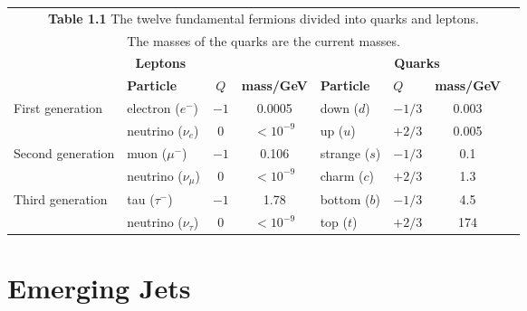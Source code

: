 
\begin{table}[h] %
	\centering
	\setlength{\tabcolsep}{10pt}
	\begin{tabular}{l l c c | l l c c}
		\multicolumn{8}{c}{\textbf{Table 1.1} The twelve fundamental fermions divided into quarks and leptons.}                                                \\
		\multicolumn{8}{c}{The masses of the quarks are the current masses.}                                                                                   \\
		\toprule
		\multicolumn{4}{c}{\textbf{Leptons}} & \multicolumn{4}{c}{\textbf{Quarks}}                                                                             \\
		\midrule
		\textbf{}                            & \textbf{Particle}                   & $Q$  & \textbf{mass/GeV} & \textbf{Particle} & $Q$    & \textbf{mass/GeV} \\
		\midrule
		First generation                     & electron ($e^-$)                    & $-1$ & 0.0005            & down ($d$)        & $-1/3$ & 0.003             \\
		                                     & neutrino ($\nu_e$)                  & 0    & $<10^{-9}$        & up ($u$)          & $+2/3$ & 0.005             \\
		\midrule
		Second generation                    & muon ($\mu^-$)                      & $-1$ & 0.106             & strange ($s$)     & $-1/3$ & 0.1               \\
		                                     & neutrino ($\nu_\mu$)                & 0    & $<10^{-9}$        & charm ($c$)       & $+2/3$ & 1.3               \\
		\midrule
		Third generation                     & tau ($\tau^-$)                      & $-1$ & 1.78              & bottom ($b$)      & $-1/3$ & 4.5               \\
		                                     & neutrino ($\nu_\tau$)               & 0    & $<10^{-9}$        & top ($t$)         & $+2/3$ & 174               \\
		\bottomrule
	\end{tabular}
	\label{SM_particles}
\end{table}


\section{Emerging Jets}

